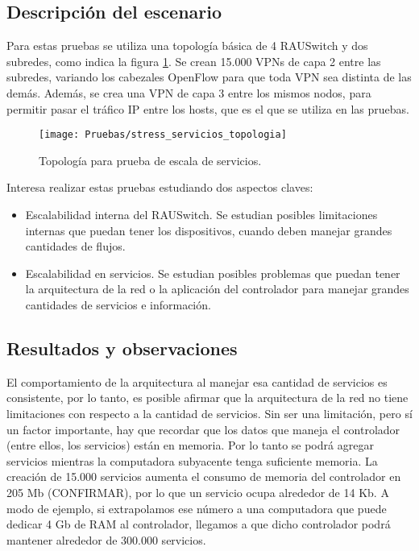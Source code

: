 \subsection{Descripción del escenario}
Para estas pruebas se utiliza una topología básica de 4 RAUSwitch y dos subredes, como indica la figura \ref{fig:stress_servicios_topologia}. Se crean 15.000 VPNs de capa 2 entre las subredes, variando los cabezales OpenFlow para que toda VPN sea distinta de las demás. Además, se crea una VPN de capa 3 entre los mismos nodos, para permitir pasar el tráfico IP entre los hosts, que es el que se utiliza en las pruebas.

\begin{figure}[t]
	\caption{Topología para prueba de escala de servicios.}
	\texttt{[image: Pruebas/stress\_servicios\_topologia]}
	\centering
	\label{fig:stress_servicios_topologia}
\end{figure}

Interesa realizar estas pruebas estudiando dos aspectos claves:
\begin{itemize}
	\item Escalabilidad interna del RAUSwitch. Se estudian posibles limitaciones internas que puedan tener los dispositivos, cuando deben manejar grandes cantidades de flujos.
	\item Escalabilidad en servicios. Se estudian posibles problemas que puedan tener la arquitectura de la red o la aplicación del controlador para manejar grandes cantidades de servicios e información.
\end{itemize}


\subsection{Resultados y observaciones}
El comportamiento de la arquitectura al manejar esa cantidad de servicios es consistente, por lo tanto, es posible afirmar que la arquitectura de la red no tiene limitaciones con respecto a la cantidad de servicios. Sin ser una limitación, pero sí un factor importante, hay que recordar que los datos que maneja el controlador (entre ellos, los servicios) están en memoria. Por lo tanto se podrá agregar servicios mientras la computadora subyacente tenga suficiente memoria. La creación de 15.000 servicios aumenta el consumo de memoria del controlador en 205 Mb (CONFIRMAR), por lo que un servicio ocupa alrededor de 14 Kb. A modo de ejemplo, si extrapolamos ese número a una computadora que puede dedicar 4 Gb de RAM al controlador, llegamos a que dicho controlador podrá mantener alrededor de 300.000 servicios.


